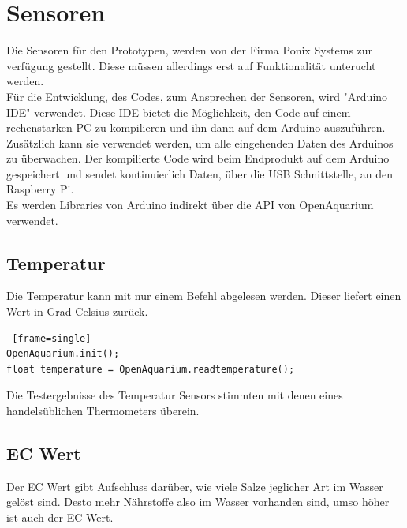 \documentclass[11pt]{article}
\begin{document}
\section{Sensoren}
Die Sensoren f\"ur den Prototypen, werden von der Firma Ponix Systems zur verf\"ugung gestellt. Diese m\"ussen allerdings erst auf Funktionalit\"at unterucht werden. \\
F\"ur die Entwicklung, des Codes, zum Ansprechen der Sensoren, wird "Arduino IDE" verwendet. Diese IDE bietet die M\"oglichkeit, den Code auf einem rechenstarken PC zu kompilieren und ihn dann auf dem Arduino auszuf\"uhren. Zus\"atzlich kann sie verwendet werden, um alle eingehenden Daten des Arduinos zu \"uberwachen.
Der kompilierte Code wird beim Endprodukt auf dem Arduino gespeichert und sendet kontinuierlich Daten, \"uber die USB Schnittstelle, an den Raspberry Pi.\\
Es werden Libraries von Arduino indirekt \"uber die API von OpenAquarium verwendet.

\subsection{Temperatur}
Die Temperatur kann mit nur einem Befehl abgelesen werden. Dieser liefert einen Wert in Grad Celsius zur\"uck.
\begin{lstlisting} [frame=single]
OpenAquarium.init();
float temperature = OpenAquarium.readtemperature();
\end{lstlisting}
Die Testergebnisse des Temperatur Sensors stimmten mit denen eines handels\"ublichen Thermometers \"uberein.

\subsection{EC Wert}
Der EC Wert gibt Aufschluss dar\"uber, wie viele Salze jeglicher Art im Wasser gel\"ost sind. Desto mehr N\"ahrstoffe also im Wasser vorhanden sind, umso h\"oher ist auch der EC Wert.
\end{document}
